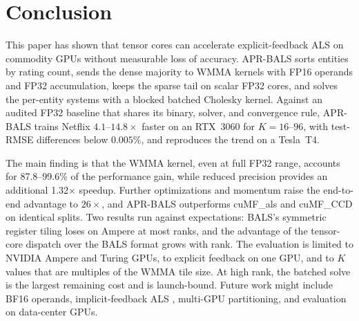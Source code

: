 \section{Conclusion}
\label{sec:conclusion}

This paper has shown that tensor cores can accelerate explicit-feedback ALS on commodity GPUs without measurable loss of accuracy. APR-BALS sorts entities by rating count, sends the dense majority to WMMA kernels with FP16 operands and FP32 accumulation, keeps the sparse tail on scalar FP32 cores, and solves the per-entity systems with a blocked batched Cholesky kernel. Against an audited FP32 baseline that shares its binary, solver, and convergence rule, APR-BALS trains Netflix $4.1$--$14.8\times$ faster on an RTX~3060 for $K=16$--$96$, with test-RMSE differences below $0.005\%$, and reproduces the trend on a Tesla~T4.

The main finding is that the WMMA kernel, even at full FP32 range, accounts for 87.8–99.6\% of the performance gain, while reduced precision provides an additional 1.32× speedup. Further optimizations and momentum raise the end-to-end advantage to $26\times$, and APR-BALS outperforms cuMF\_als and cuMF\_CCD on identical splits. Two results run against expectations: BALS's symmetric register tiling loses on Ampere at most ranks, and the advantage of the tensor-core dispatch over the BALS format grows with rank. The evaluation is limited to NVIDIA Ampere and Turing GPUs, to explicit feedback on one GPU, and to $K$ values that are multiples of the WMMA tile size. At high rank, the batched solve is the largest remaining cost and is launch-bound. Future work might include BF16 operands, implicit-feedback ALS \cite{hu2008collaborative}, multi-GPU partitioning, and evaluation on data-center GPUs.
